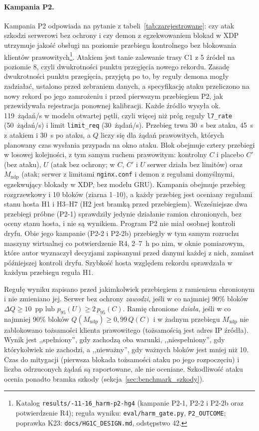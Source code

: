 \documentclass[a4paper,12pt]{article}
\begin{document}
\paragraph{Kampania P2.} Kampania P2 odpowiada na pytanie z tabeli~\ref{tab:zarejestrowane}: czy atak szkodzi serwerowi bez ochrony i czy demon z egzekwowaniem blokad w XDP utrzymuje jakość obsługi na poziomie przebiegu kontrolnego bez blokowania klientów prawowitych\footnote{\raggedright Katalog \texttt{results/-11-16\_\allowbreak harm-p2-hg4} (kampanie P2-1, P2-2 i P2-2b oraz potwierdzenie R4); reguła wyniku: \texttt{eval/\allowbreak harm\_gate.py}, \texttt{P2\_OUTCOME}; poprawka K23: \texttt{docs/\allowbreak HG1C\_DESIGN.md}, odstępstwo 42.}. Atakiem jest tanie zalewanie trasy C1 z 5 źródeł na poziomie 8, czyli dwukrotności punktu przegięcia nowego rekordu. Zasadę dwukrotności punktu przegięcia, przyjętą po to, by reguły demona mogły zadziałać, ustalono przed zebraniem danych, a specyfikację ataku przeliczono na nowy rekord po jego zamrożeniu i przed pierwszym przebiegiem P2, jak przewidywała rejestracja ponownej kalibracji. Każde źródło wysyła ok. 119~żądań/s w modelu otwartej pętli, czyli więcej niż próg reguły \texttt{l7\_rate} (50~żądań/s) i limit \texttt{limit\_req} (30~żądań/s). Przebieg trwa 30~s bez ataku, 45~s z atakiem i 30~s po ataku, a $Q$ liczy się dla żądań prawowitych, których planowany czas wysłania przypada na okno ataku. Blok obejmuje cztery przebiegi w losowej kolejności, z tym samym ruchem prawowitym: kontrolny $C$ i placebo $C'$ (bez ataku), $U$ (atak bez ochrony; w $C$, $C'$ i $U$ serwer działa bez limitów) oraz $M_{\mathrm{xdp}}$ (atak; serwer z limitami \texttt{nginx.conf} i demon z regułami domyślnymi, egzekwujący blokady w XDP, bez modelu GRU). Kampania obejmuje przebieg rozgrzewkowy i 10 bloków (ziarna 1--10), a każdy przebieg jest oceniany regułami stanu hosta H1 i H3--H7 (H2 jest bramką przed przebiegiem). Wcześniejsze dwa przebiegi próbne (P2-1) sprawdziły jedynie działanie ramion chronionych, bez oceny stanu hosta, i nie są wynikiem. Program P2 nie miał osobnej kontroli dryfu. Obie jego kampanie (P2-2 i P2-2b) przebiegły w tym samym rozruchu maszyny wirtualnej co potwierdzenie R4, 2--7~h po nim, w oknie pomiarowym, które autor wyznaczył decyzjami zapisanymi przed danymi każdej z nich, zamiast późniejszej kontroli dryfu. Szybkość hosta względem rekordu sprawdzała w każdym przebiegu reguła H1.

Regułę wyniku zapisano przed jakimkolwiek przebiegiem z ramieniem chronionym i nie zmieniano jej. Serwer bez ochrony \textit{zawodzi}, jeśli w co najmniej 90\% bloków $\Delta Q \geq 10$~pp lub $p_{95}(U) \geq 2\,p_{95}(C)$. Ramię chronione \textit{działa}, jeśli w co najmniej 90\% bloków $Q(M_{\mathrm{xdp}}) \geq 0{,}99\,Q(C)$ i w żadnym przebiegu $M_{\mathrm{xdp}}$ nie zablokowano tożsamości klienta prawowitego (tożsamością jest adres IP źródła). Wynik jest ,,spełniony'', gdy zachodzą oba warunki, ,,niespełniony'', gdy którykolwiek nie zachodzi, a ,,nieważny'', gdy ważnych bloków jest mniej niż 10. Czas do mitygacji (pierwsza blokada tożsamości ataku po jego rozpoczęciu) i liczba odrzuconych żądań są raportowane, ale nie oceniane. Szkodliwość ataku ocenia ponadto bramka szkody (sekcja~\ref{sec:benchmark_szkody}).
\end{document}
